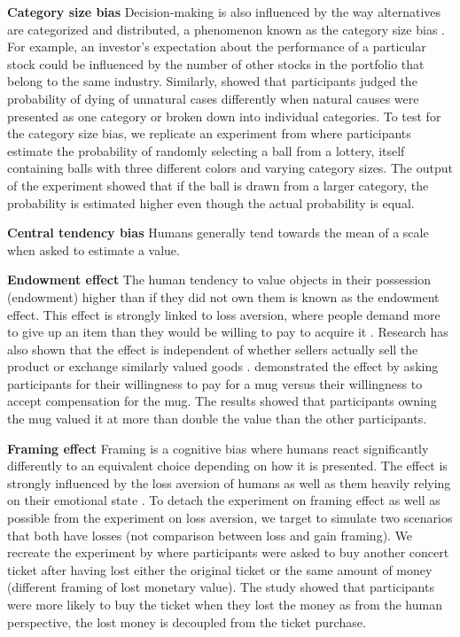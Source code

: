 \par \textbf{Category size bias} Decision-making is also influenced by the way alternatives are categorized and distributed, a phenomenon known as the category size bias \parencite{isaac2014judging}. For example, an investor's expectation about the performance of a particular stock could be influenced by the number of other stocks in the portfolio that belong to the same industry. Similarly, \textcite{tversky1994support} showed that participants judged the probability of dying of unnatural cases differently when natural causes were presented as one category or  broken down into individual categories. To test for the category size bias, we replicate an experiment from \textcite{isaac2014judging} where participants estimate the probability of randomly selecting a ball from a lottery, itself containing balls with three different colors and varying category sizes. The output of the experiment showed that if the ball is drawn from a larger category, the probability is estimated higher even though the actual probability is equal.

\par \textbf{Central tendency bias} Humans generally tend towards the mean of a scale when asked to estimate a value.

\par \textbf{Endowment effect} The human tendency to value objects in their possession (endowment) higher than if they did not own them is known as the endowment effect. This effect is strongly linked to loss aversion, where people demand more to give up an item than they would be willing to pay to acquire it \parencite{kahneman1990experimental}. Research has also shown that the effect is independent of whether sellers actually sell the product or exchange similarly valued goods \parencite{knetsch1989endowment}. \textcite{kahneman1990experimental} demonstrated the effect by asking participants for their willingness to pay for a mug versus their willingness to accept compensation for the mug. The results showed that participants owning the mug valued it at more than double the value than the other participants.

\par \textbf{Framing effect} Framing is a cognitive bias where humans react significantly differently to an equivalent choice depending on how it is presented. The effect is strongly influenced by the loss aversion of humans as well as them heavily relying on their emotional state \parencite{tversky1981framing}. To detach the experiment on framing effect as well as possible from the experiment on loss aversion, we target to simulate two scenarios that both have losses (not comparison between loss and gain framing). We recreate the experiment by \textcite{tversky1981framing} where participants were asked to buy another concert ticket after having lost either the original ticket or the same amount of money (different framing of lost monetary value). The study showed that participants were more likely to buy the ticket when they lost the money as from the human perspective, the lost money is decoupled from the ticket purchase.

